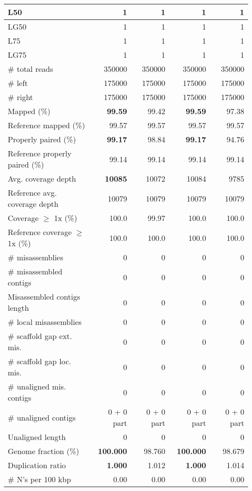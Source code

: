 \documentclass[12pt,a4paper]{article}
\begin{document}
\begin{table}[ht]
\begin{center}
\begin{tabular}{|l*{4}{|r}|}
L50 & 1 & 1 & 1 & 1 \\ \hline
LG50 & 1 & 1 & 1 & 1 \\ \hline
L75 & 1 & 1 & 1 & 1 \\ \hline
LG75 & 1 & 1 & 1 & 1 \\ \hline
\# total reads & 350000 & 350000 & 350000 & 350000 \\ \hline
\# left & 175000 & 175000 & 175000 & 175000 \\ \hline
\# right & 175000 & 175000 & 175000 & 175000 \\ \hline
Mapped (\%) & {\bf 99.59} & 99.42 & {\bf 99.59} & 97.38 \\ \hline
Reference mapped (\%) & 99.57 & 99.57 & 99.57 & 99.57 \\ \hline
Properly paired (\%) & {\bf 99.17} & 98.84 & {\bf 99.17} & 94.76 \\ \hline
Reference properly paired (\%) & 99.14 & 99.14 & 99.14 & 99.14 \\ \hline
Avg. coverage depth & {\bf 10085} & 10072 & 10084 & 9785 \\ \hline
Reference avg. coverage depth & 10079 & 10079 & 10079 & 10079 \\ \hline
Coverage $\geq$ 1x (\%) & 100.0 & 99.97 & 100.0 & 100.0 \\ \hline
Reference coverage $\geq$ 1x (\%) & 100.0 & 100.0 & 100.0 & 100.0 \\ \hline
\# misassemblies & 0 & 0 & 0 & 0 \\ \hline
\# misassembled contigs & 0 & 0 & 0 & 0 \\ \hline
Misassembled contigs length & 0 & 0 & 0 & 0 \\ \hline
\# local misassemblies & 0 & 0 & 0 & 0 \\ \hline
\# scaffold gap ext. mis. & 0 & 0 & 0 & 0 \\ \hline
\# scaffold gap loc. mis. & 0 & 0 & 0 & 0 \\ \hline
\# unaligned mis. contigs & 0 & 0 & 0 & 0 \\ \hline
\# unaligned contigs & 0 + 0 part & 0 + 0 part & 0 + 0 part & 0 + 0 part \\ \hline
Unaligned length & 0 & 0 & 0 & 0 \\ \hline
Genome fraction (\%) & {\bf 100.000} & 98.760 & {\bf 100.000} & 98.679 \\ \hline
Duplication ratio & {\bf 1.000} & 1.012 & {\bf 1.000} & 1.014 \\ \hline
\# N's per 100 kbp & 0.00 & 0.00 & 0.00 & 0.00 \\ \hline

\end{tabular}
\end{center}
\end{table}
\end{document}
